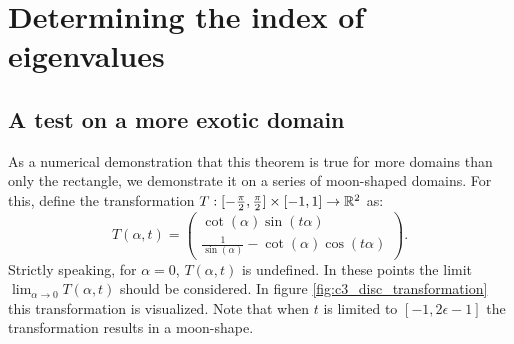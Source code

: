 \section{Determining the index of eigenvalues}

\begin{theorem}
    \label{the:c3_counting_eigenvalues}
\end{theorem}

\subsection{A test on a more exotic domain}

As a numerical demonstration that this theorem is true for more domains than only the rectangle, we demonstrate it on a series of moon-shaped domains. For this, define the transformation $T:[-\frac{\pi}{2}, \frac{\pi}{2}] \times [-1, 1] \to \mathbb{R}^2$ as:
\begin{equation}\label{equ:c3_disc_transformation}
    T(\alpha, t) = \begin{pmatrix}
        \cot(\alpha) \sin(t \alpha) \\
        \frac{1}{\sin(\alpha)} - \cot(\alpha) \cos(t \alpha)
    \end{pmatrix}\text{.}
\end{equation}
Strictly speaking, for $\alpha = 0$,  $T(\alpha, t)$ is undefined. In these points the limit $\lim_{\alpha \to 0} T(\alpha, t)$ should be considered. In figure \ref{fig:c3_disc_transformation} this transformation is visualized. Note that when $t$ is limited to $[-1, 2\epsilon -1]$ the transformation results in a moon-shape.

